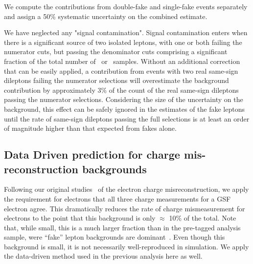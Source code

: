 We compute the contributions from double-fake and single-fake events separately and assign a 50\% systematic
uncertainty on the combined estimate.

We have neglected any "signal contamination". 
Signal contamination enters when there is a significant
source of two isolated leptons, with one or both failing the numerator cuts, but passing the denominator cuts
comprising  a significant fraction of the total number of \nNoNu\ or \nNoNo\ samples. 
Without an additional correction that can be easily applied,
a contribution from events with two real same-sign dileptons failing the numerator selections
 will overestimate the background contribution by approximately 3\% of the count of
the real same-sign dileptons passing the numerator selections.
Considering the size of the uncertainty on the background,
this effect can be safely ignored in the estimates 
of the fake leptons until the rate of same-sign dileptons passing the full
selections is at least an order of magnitude  higher than that expected
from fakes alone.


\subsection{Data Driven prediction for charge mis-reconstruction backgrounds}
\label{sec:flips}


Following our original studies~\cite{sspaper2010} of the electron charge misreconstruction, 
we apply the requirement for electrons that all three charge measurements for a GSF electron agree. 
This dramatically reduces the rate of charge mismeasurement for electrons to
the point that this background is only $\approx$ 10\% of the total.  Note 
that, while small, this is a much larger fraction than in
the pre-tagged analysis sample, were ``fake'' lepton backgrounds are
dominant~\cite{sspaper2010,sspaper201,ssnote2011}.
Even though this background is small, it is not necessarily 
well-reproduced in simulation.
We apply the data-driven method used in the previous 
analysis\cite{sspaper2010,sspaper2011,ssnote2011}
here
as well.

